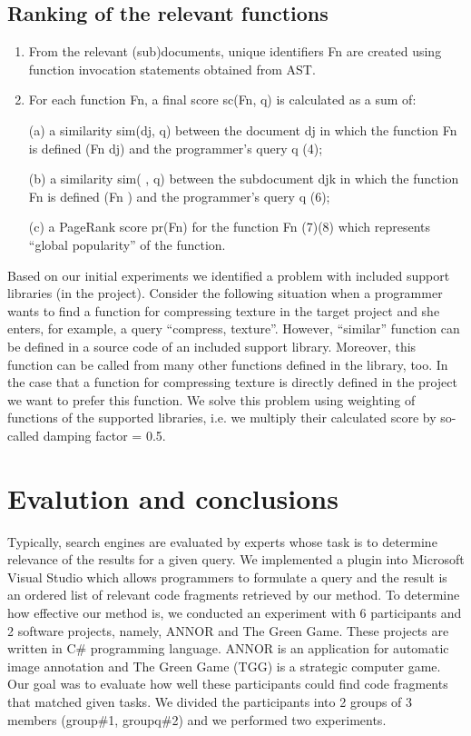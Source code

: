 \documentclass{llncs}
\begin{document}
\subsection{Ranking of the relevant functions}
\begin{enumerate}
\item From the relevant (sub)documents, unique identifiers Fn are created using function
invocation statements obtained from AST.
\item For each function Fn, a final score sc(Fn, q) is calculated as a sum of:
\item[(a)] a similarity sim(dj, q) between the document dj in which the function Fn is defined
(Fn dj) and the programmer’s query q (4);
\item[(b)] a similarity sim( , q) between the subdocument djk in which the function Fn is
defined (Fn ) and the programmer’s query q (6);
\item[(c)] a PageRank score pr(Fn) for the function Fn (7)(8) which represents “global
popularity” of the function.
\end{enumerate}

Based on our initial experiments we identified a problem with included support libraries
(in the project). Consider the following situation when a programmer wants to
find a function for compressing texture in the target project and she enters, for example,
a query “compress, texture”. However, “similar” function can be defined in a
source code of an included support library. Moreover, this function can be called from
many other functions defined in the library, too. In the case that a function for compressing
texture is directly defined in the project we want to prefer this function. We
solve this problem using weighting of functions of the supported libraries, i.e. we
multiply their calculated score by so-called damping factor = 0.5.
\section{Evalution and conclusions}

Typically, search engines are evaluated by experts whose task is to determine relevance
of the results for a given query. We implemented a plugin into Microsoft Visual
Studio which allows programmers to formulate a query and the result is an ordered
list of relevant code fragments retrieved by our method. To determine how effective
our method is, we conducted an experiment with 6 participants and 2 software projects,
namely, ANNOR and The Green Game. These projects are written in C\# programming
language. ANNOR is an application for automatic image annotation and
The Green Game (TGG) is a strategic computer game. Our goal was to evaluate how
well these participants could find code fragments that matched given tasks. We divided
the participants into 2 groups of 3 members (group\#1, groupq\#2) and we performed
two experiments.
\end{document}
